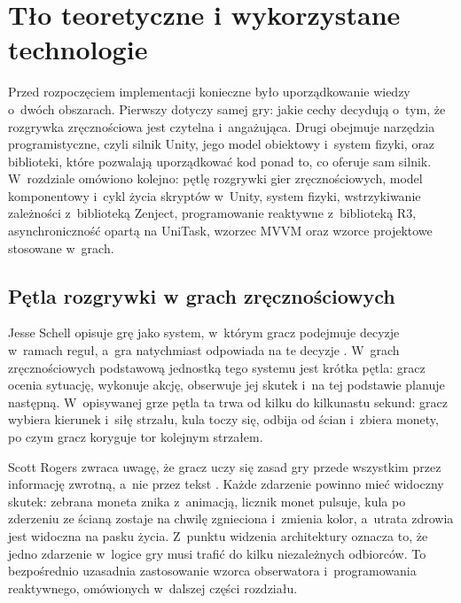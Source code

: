 \chapter{Tło teoretyczne i wykorzystane technologie}
\label{rozdz:podstawy}

Przed rozpoczęciem implementacji konieczne było uporządkowanie wiedzy o~dwóch obszarach.
Pierwszy dotyczy samej gry: jakie cechy decydują o~tym, że rozgrywka zręcznościowa jest
czytelna i~angażująca. Drugi obejmuje narzędzia programistyczne, czyli silnik Unity,
jego model obiektowy i~system fizyki, oraz biblioteki, które pozwalają uporządkować kod
ponad to, co oferuje sam silnik. W~rozdziale omówiono kolejno: pętlę rozgrywki gier
zręcznościowych, model komponentowy i~cykl życia skryptów w~Unity, system fizyki,
wstrzykiwanie zależności z~biblioteką Zenject, programowanie reaktywne z~biblioteką R3,
asynchroniczność opartą na UniTask, wzorzec MVVM oraz wzorce projektowe stosowane
w~grach.

\section{Pętla rozgrywki w grach zręcznościowych}

Jesse Schell opisuje grę jako system, w~którym gracz podejmuje decyzje w~ramach reguł,
a~gra natychmiast odpowiada na te decyzje \cite{schell}. W~grach zręcznościowych podstawową
jednostką tego systemu jest krótka pętla: gracz ocenia sytuację, wykonuje akcję, obserwuje
jej skutek i~na tej podstawie planuje następną. W~opisywanej grze pętla ta trwa od kilku
do kilkunastu sekund: gracz wybiera kierunek i~siłę strzału, kula toczy się, odbija od
ścian i~zbiera monety, po czym gracz koryguje tor kolejnym strzałem.

Scott Rogers zwraca uwagę, że gracz uczy się zasad gry przede wszystkim przez informację
zwrotną, a~nie przez tekst \cite{rogers}. Każde zdarzenie powinno mieć widoczny skutek:
zebrana moneta znika z~animacją, licznik monet pulsuje, kula po zderzeniu ze ścianą
zostaje na chwilę zgnieciona i~zmienia kolor, a~utrata zdrowia jest widoczna na pasku
życia. Z~punktu widzenia architektury oznacza to, że jedno zdarzenie w~logice gry musi
trafić do kilku niezależnych odbiorców. To bezpośrednio uzasadnia zastosowanie wzorca
obserwatora i~programowania reaktywnego, omówionych w~dalszej części rozdziału.

